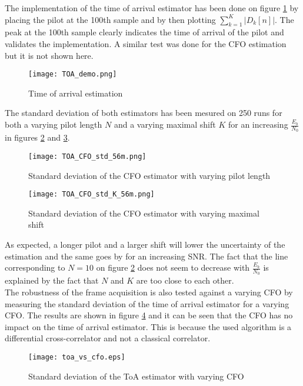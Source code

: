 The implementation of the time of arrival estimator has been done on figure \ref{fig:TOA_demo} by placing the pilot at the 100th sample and by then plotting $\sum_{k=1}^{K} |D_k[n]|$. The peak at the 100th sample clearly indicates the time of arrival of the pilot and validates the implementation. A similar test was done for the CFO estimation but it is not shown here. \\

\begin{figure}[H]
    \centering
    \texttt{[image: TOA\_demo.png]}
    \caption{Time of arrival estimation}
    \label{fig:TOA_demo}
\end{figure}

The standard deviation of both estimators has been mesured on 250 runs for both a varying pilot length $N$ and a varying maximal shift $K$ for an increasing $\frac{E_b}{N_0}$ in figures \ref{fig:TOA_CFO_std_N} and \ref{fig:TOA_CFO_std_K}. 

\begin{figure}[H]
    \centering
    \texttt{[image: TOA\_CFO\_std\_56m.png]}
    \caption{Standard deviation of the CFO estimator with varying pilot length}
    \label{fig:TOA_CFO_std_N}
\end{figure}

\begin{figure}[H]
    \centering
    \texttt{[image: TOA\_CFO\_std\_K\_56m.png]}
    \caption{Standard deviation of the CFO estimator with varying maximal shift}
    \label{fig:TOA_CFO_std_K}
\end{figure}

As expected, a longer pilot and a larger shift will lower the uncertainty of the estimation and the same goes by for an increasing SNR. The fact that the line corresponding to $N = 10$ on figure \ref{fig:TOA_CFO_std_N} does not seem to decrease with $\frac{E_b}{N_0}$ is explained by the fact that $N$ and $K$ are too close to each other.\\
The robustness of the frame acquisition is also tested against a varying CFO by measuring the standard deviation of the time of arrival estimator for a varying CFO. The results are shown in figure \ref{fig:TOA_std_CFO} and it can be seen that the CFO has no impact on the time of arrival estimator. This is because the used algorithm is a differential cross-correlator and not a classical correlator. \\

\begin{figure}[H]
    \centering
    \texttt{[image: toa\_vs\_cfo.eps]}
    \caption{Standard deviation of the ToA estimator with varying CFO}
    \label{fig:TOA_std_CFO}
\end{figure}
